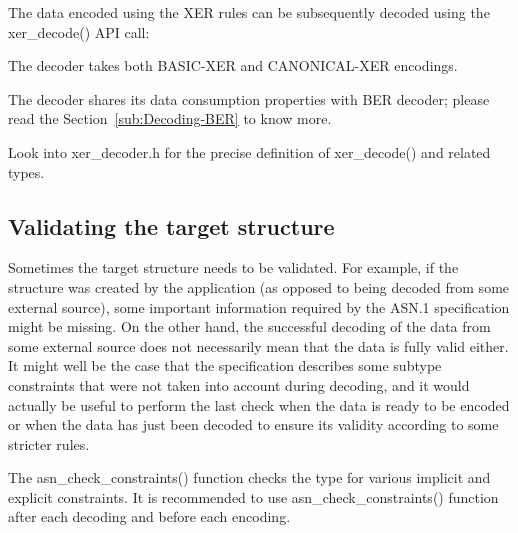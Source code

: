 \documentclass[english,oneside,12pt]{book}
\begin{document}
The data encoded using the XER rules can be subsequently decoded using
the xer\_decode() API call:
The decoder takes both BASIC-XER and CANONICAL-XER encodings.

The decoder shares its data consumption properties with BER decoder;
please read the Section~\ref{sub:Decoding-BER} to know more.

Look into xer\_decoder.h for the precise definition of xer\_decode()
and related types.


\subsection{\label{sub:Validating-the-target}Validating the target structure}

Sometimes the target structure needs to be validated. For example,
if the structure was created by the application (as opposed to being
decoded from some external source), some important information required
by the ASN.1 specification might be missing. On the other hand, the
successful decoding of the data from some external source does not
necessarily mean that the data is fully valid either. It might well
be the case that the specification describes some subtype constraints
that were not taken into account during decoding, and it would actually
be useful to perform the last check when the data is ready to be encoded
or when the data has just been decoded to ensure its validity according
to some stricter rules.

The asn\_check\_constraints() function checks the type for various
implicit and explicit constraints. It is recommended to use asn\_check\_constraints()
function after each decoding and before each encoding.
\end{document}
